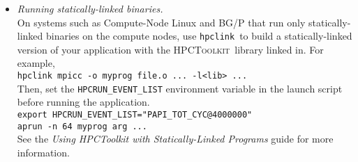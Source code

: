 \documentclass[10pt]{article}
\newcommand{\HPCToolkit}{\textsc{HPCToolkit}}
\newcommand{\hpclink}{\texttt{hpclink}}
\begin{document}
\begin{itemize}
\item{ \em Running statically-linked binaries.} \\
On systems such as Compute-Node Linux and BG/P that run only
statically-linked binaries on the compute nodes, use \hpclink\ to
build a statically-linked version of your application with the
\HPCToolkit\ library linked in.  For example, \\
\lindent
\verb|hpclink mpicc -o myprog file.o ... -l<lib> ...| \\[1ex]
Then, set the {\tt HPCRUN\_EVENT\_LIST} environment variable in the
launch script before running the application. \\
\lindent
\verb|export HPCRUN_EVENT_LIST="PAPI_TOT_CYC@4000000"| \\
\lindent
\verb|aprun -n 64 myprog arg ...| \\[1ex]
See the {\it Using {\sc HPCToolkit} with Statically-Linked Programs} guide
for more information.


\end{itemize}
\end{document}
